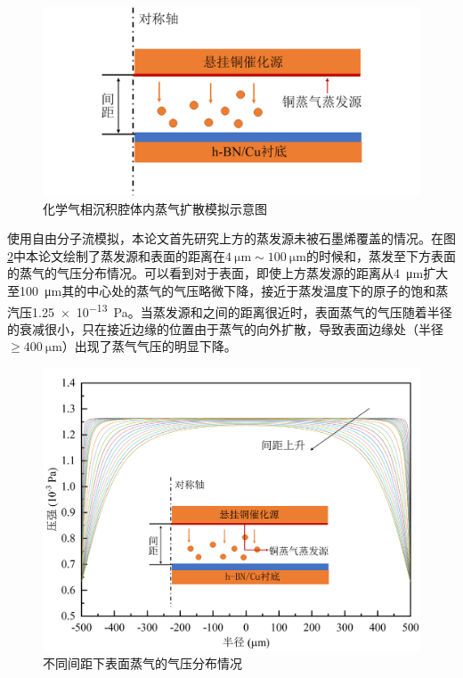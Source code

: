     \begin{figure}[htb]
        \includegraphics{pic/CG_diagram_FEM_structure.png}
        \caption{化学气相沉积腔体内蒸气扩散模拟示意图}
        \label{fig:CG_diagram_FEM_structure}
    \end{figure}

    使用自由分子流模拟，本论文首先研究上方的蒸发源未被石墨烯覆盖的情况。在图\ref{fig:CG_FEM_fullCu}中本论文绘制了蒸发源和表面的距离在$\SI{4}{\micro\meter} \sim \SI{100}{\micro\meter}$的时候和，蒸发至下方表面的蒸气的气压分布情况。可以看到对于表面，即使上方蒸发源的距离从\SI{4}{\micro\meter}扩大至\SI{100}{\micro\meter}其的中心处的蒸气的气压略微下降，接近于蒸发温度下的原子的饱和蒸汽压\SI{1.25e-13}{\pascal}。当蒸发源和之间的距离很近时，表面蒸气的气压随着半径的衰减很小，只在接近边缘的位置由于蒸气的向外扩散，导致表面边缘处（半径$\geqslant \SI{400}{\micro\meter}$）出现了蒸气气压的明显下降。
    
    \begin{figure}[htb]
        \includegraphics{pic/CG_FEM_fullCu.png}
        \caption{不同间距下表面蒸气的气压分布情况}
        \label{fig:CG_FEM_fullCu}
    \end{figure}


